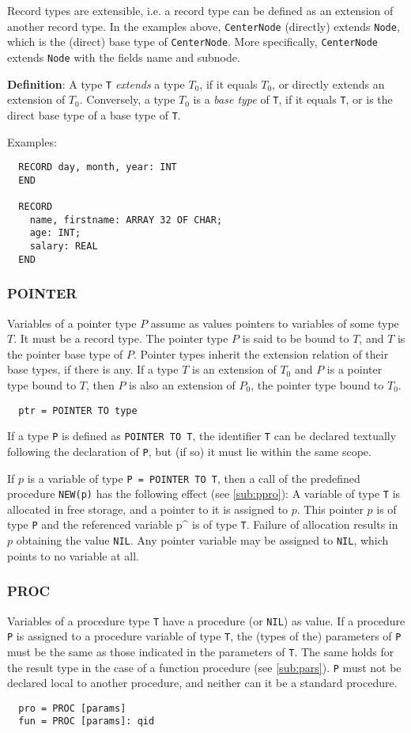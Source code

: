 Record types are extensible, i.e. a record type can be defined as an extension of another
record type. In the examples above, \verb|CenterNode| (directly) extends \verb|Node|, which
is the (direct) base type of \verb|CenterNode|. More specifically, \verb|CenterNode|
extends \verb|Node| with the fields name and subnode.

\textbf{Definition}: A type \verb|T| \emph{extends} a type $T_0$, if it equals $T_0$, or
directly extends an extension of $T_0$. Conversely, a type $T_0$ is a \emph{base type} of
\verb|T|, if it equals \verb|T|, or is the direct base type of a base type of \verb|T|.

Examples:
\begin{verbatim}
  RECORD day, month, year: INT
  END
 
  RECORD
    name, firstname: ARRAY 32 OF CHAR;
    age: INT;
    salary: REAL
  END
\end{verbatim}

\subsubsection{POINTER}
Variables of a pointer type $P$ assume as values pointers to variables of some type $T$. It must be a
record type. The pointer type $P$ is said to be bound to $T$, and $T$ is the pointer base type of $P$.
Pointer types inherit the extension relation of their base types, if there is any. If a type $T$ is an
extension of $T_0$ and $P$ is a pointer type bound to $T$, then $P$ is also an extension of $P_0$, the
pointer type bound to $T_0$.
\begin{verbatim}
  ptr = POINTER TO type
\end{verbatim}
If a type \verb|P| is defined as \verb|POINTER TO T|, the identifier \verb|T| can be declared textually
following the declaration of \verb|P|, but (if so) it must lie within the same scope.

If $p$ is a variable of type \verb|P = POINTER TO T|, then a call of the predefined procedure
\verb|NEW(p)| has the following effect (see \ref{sub:ppro}): A variable of type \verb|T| is allocated
in free storage, and a pointer to it is assigned to $p$. This pointer $p$ is of type \verb|P| and the
referenced variable p\^{} is of type \verb|T|. Failure of allocation results in $p$ obtaining the value
\verb|NIL|. Any pointer variable may be assigned to \verb|NIL|, which points to no variable at all.

\subsubsection{PROC}
Variables of a procedure type \verb|T| have a procedure (or \verb|NIL|) as value. If a procedure \verb|P|
is assigned to a procedure variable of type \verb|T|, the (types of the) parameters of \verb|P|
must be the same as those indicated in the parameters of \verb|T|. The same holds for the result
type in the case of a function procedure (see \ref{sub:pars}). \verb|P| must not be declared local to
another procedure, and neither can it be a standard procedure.
\begin{verbatim}
  pro = PROC [params]
  fun = PROC [params]: qid
\end{verbatim}

